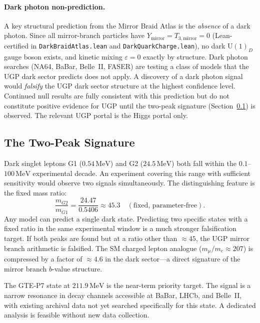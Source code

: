 \documentclass[11pt]{article}
\begin{document}
\paragraph{Dark photon non-prediction.}
A key structural prediction from the Mirror Braid Atlas is the \emph{absence} of a dark
photon. Since all mirror-branch particles have $Y_\mathrm{mirror}=T_{3,\mathrm{mirror}}=0$
(Lean-certified in \texttt{DarkBraidAtlas.lean} and \texttt{DarkQuarkCharge.lean}), no
dark $\mathrm{U}(1)_D$ gauge boson exists, and kinetic mixing $\varepsilon = 0$ exactly
by structure. Dark photon searches (NA64, BaBar, Belle~II, FASER) are testing a class of
models that the UGP dark sector predicts does not apply. A discovery of a dark photon
signal would \emph{falsify} the UGP dark sector structure at the highest confidence level.
Continued null results are fully consistent with this prediction but do not constitute
positive evidence for UGP until the two-peak signature (Section~\ref{ssec:two_peak})
is observed. The relevant UGP portal is the Higgs portal only.

\subsection{The Two-Peak Signature}
\label{ssec:two_peak}

Dark singlet leptons G1 ($0.54\,\mathrm{MeV}$) and G2 ($24.5\,\mathrm{MeV}$) both fall
within the $0.1$--$100\,\mathrm{MeV}$ experimental decade. An experiment covering this
range with sufficient sensitivity would observe two signals simultaneously. The
distinguishing feature is the fixed mass ratio:
\begin{equation}
\frac{m_{G2}}{m_{G1}} = \frac{24.47}{0.5406} \approx 45.3 \quad (\text{fixed, parameter-free}).
\label{eq:two_peak_ratio}
\end{equation}
Any model can predict a single dark state. Predicting two specific states with a fixed
ratio in the same experimental window is a much stronger falsification target. If both
peaks are found but at a ratio other than $\approx 45$, the UGP mirror branch arithmetic
is falsified. The SM charged lepton analogue ($m_\mu/m_e \approx 207$) is compressed by
a factor of $\approx 4.6$ in the dark sector---a direct signature of the mirror branch
$b$-value structure.

The GTE-P7 state at $211.9\,\mathrm{MeV}$ is the near-term priority target. The signal
is a narrow resonance in decay channels accessible at BaBar, LHCb, and Belle~II, with
existing archival data not yet searched specifically for this state. A dedicated analysis
is feasible without new data collection.
\end{document}
